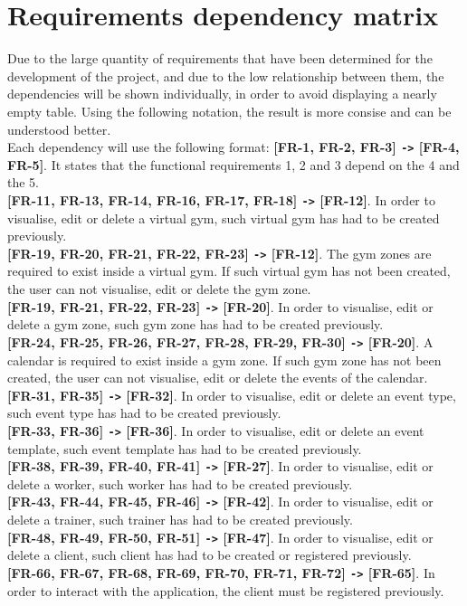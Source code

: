\documentclass[a4paper, 12pt, oneside]{book}
\begin{document}
\section{Requirements dependency matrix}
Due to the large quantity of requirements that have been determined for the development of the project, and due to the low relationship between them, the dependencies will be shown individually, in order to avoid displaying a nearly empty table. Using the following notation, the result is more consise and can be understood better.
\\[8pt]
Each dependency will use the following format: \textbf{[FR-1, FR-2, FR-3] \texttt{->} [FR-4, FR-5]}. It states that the functional requirements 1, 2 and 3 depend on the 4 and the 5.
\\[8pt]
\textbf{[FR-11, FR-13, FR-14, FR-16, FR-17, FR-18] \texttt{->} [FR-12]}. In order to visualise, edit or delete a virtual gym, such virtual gym has had to be created previously.
\\[8pt]
\textbf{[FR-19, FR-20, FR-21, FR-22, FR-23] \texttt{->} [FR-12]}. The gym zones are required to exist inside a virtual gym. If such virtual gym has not been created, the user can not visualise, edit or delete the gym zone.
\\[8pt]
\textbf{[FR-19, FR-21, FR-22, FR-23] \texttt{->} [FR-20]}. In order to visualise, edit or delete a gym zone, such gym zone has had to be created previously.
\\[8pt]
\textbf{[FR-24, FR-25, FR-26, FR-27, FR-28, FR-29, FR-30] \texttt{->} [FR-20]}. A calendar is required to exist inside a gym zone. If such gym zone has not been created, the user can not visualise, edit or delete the events of the calendar.
\\[8pt]
\textbf{[FR-31, FR-35] \texttt{->} [FR-32]}. In order to visualise, edit or delete an event type, such event type has had to be created previously.
\\[8pt]
\textbf{[FR-33, FR-36] \texttt{->} [FR-36]}. In order to visualise, edit or delete an event template, such event template has had to be created previously.
\\[8pt]
\textbf{[FR-38, FR-39, FR-40, FR-41] \texttt{->} [FR-27]}. In order to visualise, edit or delete a worker, such worker has had to be created previously.
\\[8pt]
\textbf{[FR-43, FR-44, FR-45, FR-46] \texttt{->} [FR-42]}. In order to visualise, edit or delete a trainer, such trainer has had to be created previously.
\\[8pt]
\textbf{[FR-48, FR-49, FR-50, FR-51] \texttt{->} [FR-47]}. In order to visualise, edit or delete a client, such client has had to be created or registered previously.
\\[8pt]
\textbf{[FR-66, FR-67, FR-68, FR-69, FR-70, FR-71, FR-72] \texttt{->} [FR-65]}. In order to interact with the application, the client must be registered previously.
\end{document}
